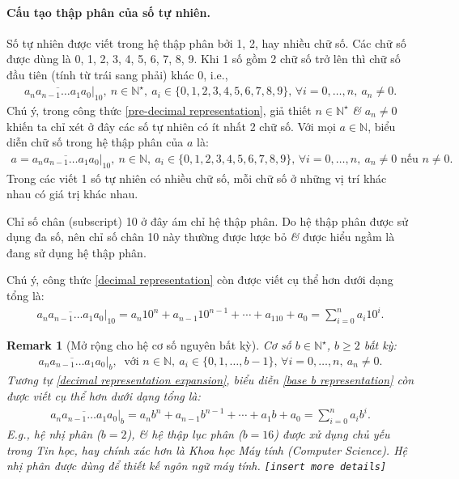 \documentclass{article}
\numberwithin{equation}{section}
\newtheorem{remark}{Remark}[section]
\begin{document}
\paragraph{Cấu tạo thập phân của số tự nhiên.} Số tự nhiên được viết trong hệ thập phân bởi 1, 2, hay nhiều chữ số. Các chữ số được dùng là 0, 1, 2, 3, 4, 5, 6, 7, 8, 9. Khi 1 số gồm 2 chữ số trở lên thì chữ số đầu tiên (tính từ trái sang phải) khác 0, i.e.,
\begin{align}
	\label{pre-decimal representation}
	\overline{a_na_{n-1}\ldots a_1a_0}|_{10},\ n\in\mathbb{N}^\star,\ a_i\in\{0,1,2,3,4,5,6,7,8,9\},\,\forall i = 0,\ldots,n,\ a_n\ne 0.
\end{align}
Chú ý, trong công thức \eqref{pre-decimal representation}, giả thiết $n\in\mathbb{N}^\star$ \textit{\&} $a_n\ne 0$ khiến ta chỉ xét ở đây các số tự nhiên có ít nhất 2 chữ số. Với mọi $a\in\mathbb{N}$, biểu diễn chữ số trong hệ thập phân của $a$ là:
\begin{align}
	\label{decimal representation}
	a = \overline{a_na_{n-1}\ldots a_1a_0}|_{10},\ n\in\mathbb{N},\ a_i\in\{0,1,2,3,4,5,6,7,8,9\},\,\forall i = 0,\ldots,n,\ a_n\ne 0\mbox{ nếu } n\ne 0.
\end{align}
Trong các viết 1 số tự nhiên có nhiều chữ số, mỗi chữ số ở những vị trí khác nhau có giá trị khác nhau.

Chỉ số chân (subscript) 10 ở đây ám chỉ hệ thập phân. Do hệ thập phân được sử dụng đa số, nên chỉ số chân 10 này thường được lược bỏ \textit{\&} được hiểu ngầm là đang sử dụng hệ thập phân.

Chú ý, công thức \eqref{decimal representation} còn được viết cụ thể hơn dưới dạng tổng là:
\begin{align}
	\label{decimal representation expansion}
	\overline{a_na_{n-1}\ldots a_1a_0}|_{10} = a_n10^n + a_{n-1}10^{n-1} + \cdots + a_110 + a_0 = \sum_{i=0}^n a_i10^i.
\end{align}

\begin{remark}[Mở rộng cho hệ cơ số nguyên bất kỳ]
	Cơ số $b\in\mathbb{N}^\star$, $b\ge 2$ bất kỳ:
	\begin{align}
		\label{base b representation}
		\overline{a_na_{n-1}\ldots a_1a_0}|_{b},\ \mbox{ với } n\in\mathbb{N},\ a_i\in\{0,1,\ldots,b - 1\},\,\forall i = 0,\ldots,n,\ a_n\ne 0.
	\end{align}
	Tương tự \eqref{decimal representation expansion}, biểu diễn \eqref{base b representation} còn được viết cụ thể hơn dưới dạng tổng là:
	\begin{align}
		\label{base b representation expansion}
		\overline{a_na_{n-1}\ldots a_1a_0}|_{b} = a_nb^n + a_{n-1}b^{n-1} + \cdots + a_1b + a_0 = \sum_{i=0}^n a_ib^i.
	\end{align}
	E.g., hệ nhị phân ($b = 2$), \textit{\&} hệ thập lục phân ($b = 16$) được xử dụng chủ yếu trong Tin học, hay chính xác hơn là Khoa học Máy tính (Computer Science). Hệ nhị phân được dùng để thiết kế ngôn ngữ máy tính. \texttt{[insert more details]}
\end{remark}
\end{document}
